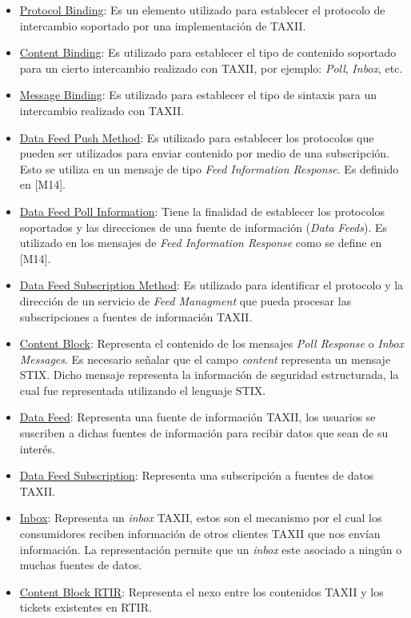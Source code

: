 	
	\begin{itemize}
		\item \underline{Protocol Binding}: Es un elemento utilizado para establecer el protocolo de intercambio
			soportado por una implementación de TAXII.
		\item \underline{Content Binding}: Es utilizado para establecer el tipo de contenido soportado para un
			cierto intercambio realizado con TAXII, por ejemplo:
		\textit{Poll},
	\textit{Inbox}, etc.
	\item \underline{Message Binding}: Es utilizado para establecer el tipo de sintaxis para un intercambio
		realizado con TAXII.
	\item \underline{Data Feed Push Method}: Es utilizado para establecer los protocolos que pueden ser
		utilizados para enviar contenido por medio de una subscripción. Esto se utiliza en un mensaje de tipo
	\textit{Feed Information Response}. Es definido en [M14].
	\item \underline{Data Feed Poll Information}: Tiene la finalidad de establecer los protocolos soportados y
		las direcciones de una fuente de información (\textit{Data
			Feeds}). Es utilizado en los mensajes de \textit{Feed Information
			Response} como se define en [M14].
	\item \underline{Data Feed Subscription Method}: Es utilizado para identificar el protocolo y la dirección
		de un servicio de \textit{Feed Managment} que pueda procesar las
		subscripciones a fuentes de información TAXII.
	\item \underline{Content Block}: Representa el contenido de los mensajes
\textit{Poll Response }o \textit{Inbox
		Messages}. Es necesario señalar que el campo
\textit{content} representa un mensaje STIX. Dicho mensaje
representa la información de seguridad estructurada, la cual fue representada utilizando el lenguaje STIX.
\item \underline{Data Feed}: Representa una fuente de información TAXII, los usuarios se suscriben a
	dichas fuentes de información para recibir datos que sean de su interés.
\item \underline{Data Feed Subscription}: Representa una subscripción a fuentes de datos TAXII.
\item \underline{Inbox}: Representa un \textit{inbox
	}TAXII, estos son el mecanismo por el cual los consumidores reciben información de otros
	clientes TAXII que nos envían información. La representación permite que un
\textit{inbox} este asociado a ningún o muchas fuentes de datos.

\item \underline{Content Block RTIR}: Representa el nexo entre los contenidos TAXII y los tickets
	existentes en RTIR.
\end{itemize}